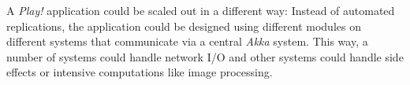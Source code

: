 A \textit{Play!} application could be scaled out in a different way: Instead of automated replications, the application could be designed using different modules on different systems that communicate via a central \textit{Akka} system. This way, a number of systems could handle network I/O and other systems could handle side effects or intensive computations like image processing.
